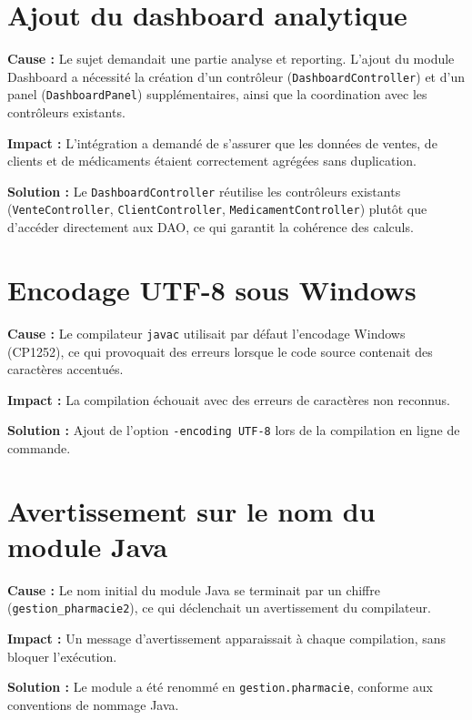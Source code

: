 \documentclass[12pt,a4paper]{report}
\begin{document}
\section{Ajout du dashboard analytique}

\textbf{Cause :} Le sujet demandait une partie analyse et reporting. L'ajout du module Dashboard a nécessité la création d'un contrôleur (\texttt{DashboardController}) et d'un panel (\texttt{DashboardPanel}) supplémentaires, ainsi que la coordination avec les contrôleurs existants.

\textbf{Impact :} L'intégration a demandé de s'assurer que les données de ventes, de clients et de médicaments étaient correctement agrégées sans duplication.

\textbf{Solution :} Le \texttt{DashboardController} réutilise les contrôleurs existants (\texttt{VenteController}, \texttt{ClientController}, \texttt{MedicamentController}) plutôt que d'accéder directement aux DAO, ce qui garantit la cohérence des calculs.

\section{Encodage UTF-8 sous Windows}

\textbf{Cause :} Le compilateur \texttt{javac} utilisait par défaut l'encodage Windows (CP1252), ce qui provoquait des erreurs lorsque le code source contenait des caractères accentués.

\textbf{Impact :} La compilation échouait avec des erreurs de caractères non reconnus.

\textbf{Solution :} Ajout de l'option \texttt{-encoding UTF-8} lors de la compilation en ligne de commande.

\section{Avertissement sur le nom du module Java}

\textbf{Cause :} Le nom initial du module Java se terminait par un chiffre (\texttt{gestion\_pharmacie2}), ce qui déclenchait un avertissement du compilateur.

\textbf{Impact :} Un message d'avertissement apparaissait à chaque compilation, sans bloquer l'exécution.

\textbf{Solution :} Le module a été renommé en \texttt{gestion.pharmacie}, conforme aux conventions de nommage Java.

\end{document}
